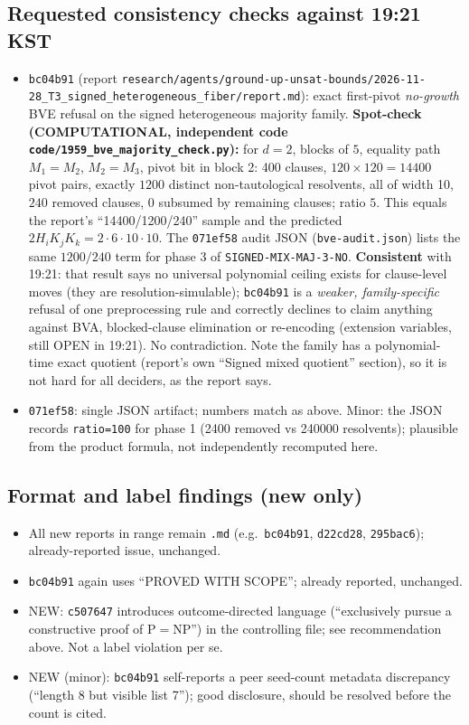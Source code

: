 \documentclass[11pt]{article}
\begin{document}
\subsection*{Requested consistency checks against 19:21 KST}
\begin{itemize}
\item \texttt{bc04b91} (report \texttt{research/agents/ground-up-unsat-bounds/2026-11-28\_T3\_signed\_heterogeneous\_fiber/report.md}): exact first-pivot \emph{no-growth} BVE refusal on the signed heterogeneous majority family. \textbf{Spot-check (COMPUTATIONAL, independent code \texttt{code/1959\_bve\_majority\_check.py}):} for $d=2$, blocks of $5$, equality path $M_1{=}M_2$, $M_2{=}M_3$, pivot bit in block 2: 400 clauses, $120{\times}120=14400$ pivot pairs, exactly $1200$ distinct non-tautological resolvents, all of width 10, $240$ removed clauses, $0$ subsumed by remaining clauses; ratio $5$. This equals the report's ``14400/1200/240'' sample and the predicted $2H_iK_jK_k=2\cdot6\cdot10\cdot10$. The \texttt{071ef58} audit JSON (\texttt{bve-audit.json}) lists the same $1200/240$ term for phase 3 of \texttt{SIGNED-MIX-MAJ-3-NO}. \textbf{Consistent} with 19:21: that result says no universal polynomial ceiling exists for clause-level moves (they are resolution-simulable); \texttt{bc04b91} is a \emph{weaker, family-specific} refusal of one preprocessing rule and correctly declines to claim anything against BVA, blocked-clause elimination or re-encoding (extension variables, still OPEN in 19:21). No contradiction. Note the family has a polynomial-time exact quotient (report's own ``Signed mixed quotient'' section), so it is not hard for all deciders, as the report says.
\item \texttt{071ef58}: single JSON artifact; numbers match as above. Minor: the JSON records \texttt{ratio=100} for phase 1 (2400 removed vs 240000 resolvents); plausible from the product formula, not independently recomputed here.
\end{itemize}

\subsection*{Format and label findings (new only)}
\begin{itemize}
\item All new reports in range remain \texttt{.md} (e.g.\ \texttt{bc04b91}, \texttt{d22cd28}, \texttt{295bac6}); already-reported issue, unchanged.
\item \texttt{bc04b91} again uses ``PROVED WITH SCOPE''; already reported, unchanged.
\item NEW: \texttt{c507647} introduces outcome-directed language (``exclusively pursue a constructive proof of P$=$NP'') in the controlling file; see recommendation above. Not a label violation per se.
\item NEW (minor): \texttt{bc04b91} self-reports a peer seed-count metadata discrepancy (``length 8 but visible list 7''); good disclosure, should be resolved before the count is cited.
\end{itemize}
\end{document}
